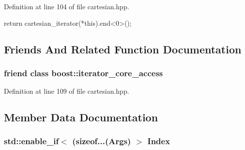 \-Definition at line 104 of file cartesian.\-hpp.


\begin{DoxyCode}
            {
                return cartesian_iterator(*this).end<0>();
            }
\end{DoxyCode}


\subsection{\-Friends \-And \-Related \-Function \-Documentation}
\hypertarget{structyuh_1_1detail_1_1cartesian__iterator_ac09f73e325921cc50ebcd96bed0f8096}{
\subsubsection[{boost\-::iterator\-\_\-core\-\_\-access}]{\setlength{\rightskip}{0pt plus 5cm}friend class boost\-::iterator\-\_\-core\-\_\-access}}\label{d4/dcb/structyuh_1_1detail_1_1cartesian__iterator_ac09f73e325921cc50ebcd96bed0f8096}


\-Definition at line 109 of file cartesian.\-hpp.



\subsection{\-Member \-Data \-Documentation}
\hypertarget{structyuh_1_1detail_1_1cartesian__iterator_ad246a90285e74f351a7fb7afc43c0348}{
\subsubsection[{\-Index}]{\setlength{\rightskip}{0pt plus 5cm}std\-::enable\-\_\-if$<$ (sizeof...(\-Args) $>$ {\bf \-Index}}}\label{d4/dcb/structyuh_1_1detail_1_1cartesian__iterator_ad246a90285e74f351a7fb7afc43c0348}


